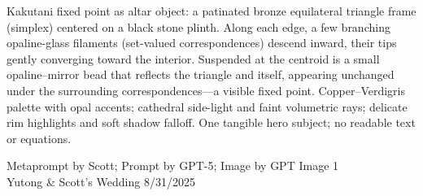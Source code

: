 \documentclass[12pt]{article}
\begin{document}
\noindent
\begin{adjustbox}{max size={\textwidth}{\textheight}}
\begin{varwidth}{\textwidth}
\RaggedRight
\footnotesize
Kakutani fixed point as altar object: a patinated bronze equilateral triangle frame (simplex) centered on a black stone plinth. Along each edge, a few branching opaline-glass filaments (set-valued correspondences) descend inward, their tips gently converging toward the interior. Suspended at the centroid is a small opaline–mirror bead that reflects the triangle and itself, appearing unchanged under the surrounding correspondences—a visible fixed point. Copper–Verdigris palette with opal accents; cathedral side-light and faint volumetric rays; delicate rim highlights and soft shadow falloff. One tangible hero subject; no readable text or equations.
\end{varwidth}
\end{adjustbox}
\vfill
{\raggedleft\footnotesize
Metaprompt by Scott; Prompt by GPT-5; Image by GPT Image 1 \\
Yutong \& Scott's Wedding 8/31/2025\par}
\end{document}

